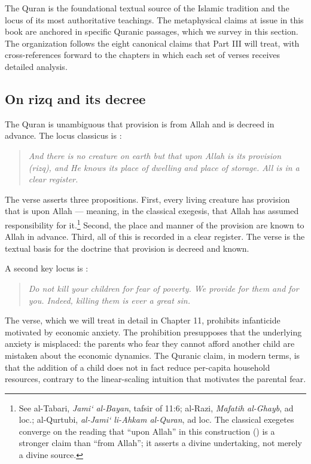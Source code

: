 The Quran is the foundational textual source of the Islamic tradition
and the locus of its most authoritative teachings. The metaphysical
claims at issue in this book are anchored in specific Quranic
passages, which we survey in this section. The organization follows
the eight canonical claims that Part III will treat, with cross-references
forward to the chapters in which each set of verses receives detailed
analysis.

\subsection{On rizq and its decree}

The Quran is unambiguous that provision is from Allah and is decreed
in advance. The locus classicus is :

\begin{quote}
\textit{And there is no creature on earth but that upon Allah is its
provision (rizq), and He knows its place of dwelling and place of
storage. All is in a clear register.}
\end{quote}

The verse asserts three propositions. First, every living creature
has provision that is upon Allah --- meaning, in the classical
exegesis, that Allah has assumed responsibility for it.\footnote{See
al-Tabari, \textit{Jami` al-Bayan}, tafsir of 11:6; al-Razi,
\textit{Mafatih al-Ghayb}, ad loc.; al-Qurtubi, \textit{al-Jami`
li-Ahkam al-Quran}, ad loc. The classical exegetes converge on the
reading that ``upon Allah'' in this construction () is a stronger claim than ``from Allah''; it asserts a divine
undertaking, not merely a divine source.} Second, the place and
manner of the provision are known to Allah in advance. Third, all
of this is recorded in a clear register. The verse is the textual
basis for the doctrine that provision is decreed and known.

A second key locus is :

\begin{quote}
\textit{Do not kill your children for fear of poverty. We provide
for them and for you. Indeed, killing them is ever a great sin.}
\end{quote}

The verse, which we will treat in detail in Chapter 11, prohibits
infanticide motivated by economic anxiety. The prohibition presupposes
that the underlying anxiety is misplaced: the parents who fear they
cannot afford another child are mistaken about the economic dynamics.
The Quranic claim, in modern terms, is that the addition of a child
does not in fact reduce per-capita household resources, contrary to
the linear-scaling intuition that motivates the parental fear.

